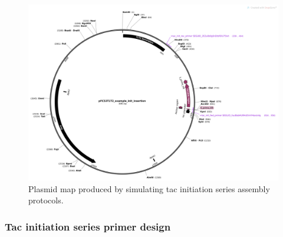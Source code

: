 \documentclass[11pt]{article}
\begin{document}
\begin{figure}[H]
	\includegraphics[width=15cm]{images/plasmid_maps/tac_init_simulated_assembly.png}
	\centering
	\caption{Plasmid map produced by simulating tac initiation series assembly protocols.}
\end{figure}


\subsubsection{Tac initiation series primer design}
\end{document}
